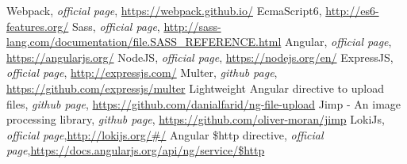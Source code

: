 \begin{thebibliography}{99999}
\singlespace\normalsize

 Webpack, \textit{ official page}, \url{https://webpack.github.io/}
 EcmaScript6, \url{http://es6-features.org/}
 Sass, \textit{ official page}, \url{http://sass-lang.com/documentation/file.SASS_REFERENCE.html}
 Angular, \textit{ official page}, \url{https://angularjs.org/}
 NodeJS, \textit{ official page}, \url{https://nodejs.org/en/}
 ExpressJS, \textit{ official page}, \url{http://expressjs.com/}
 Multer, \textit{ github page}, \url{https://github.com/expressjs/multer}
 Lightweight Angular directive to upload files, \textit{ github page}, \url{https://github.com/danialfarid/ng-file-upload}
 Jimp - An image processing library, \textit{ github page}, \url{https://github.com/oliver-moran/jimp}
 LokiJs, \textit{ official page},\url{http://lokijs.org/#/}
 Angular \$http directive, \textit{ official page},\url{https://docs.angularjs.org/api/ng/service/$http}




\end{thebibliography}
